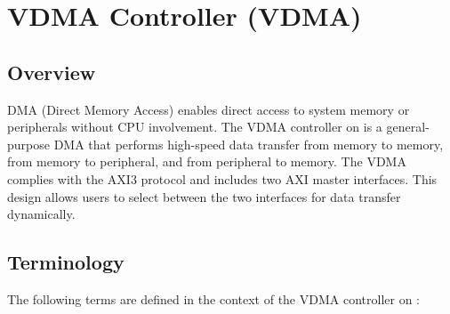 \documentclass[main\_\_EN.tex]{subfiles}
\begin{document}

\ifglobal
\else
    {\let\clearpage\relax \listoftodos}
    {\let\clearpage\relax \listofdonetodos}
    \tableofcontents
\fi



\hypertarget{vdma}{}

\chapter{VDMA Controller (VDMA)}
\label{mod:vdma}


\section{Overview}

DMA (Direct Memory Access) enables direct access to system memory or peripherals without CPU involvement. The VDMA controller on \chipname{} is a general-purpose DMA that performs high-speed data transfer from memory to memory, from memory to peripheral, and from peripheral to memory. The VDMA complies with the AXI3 protocol and includes two AXI master interfaces. This design allows users to select between the two interfaces for data transfer dynamically.


\section{Terminology}

The following terms are defined in the context of the VDMA controller on \chipname{}:
\end{document}
